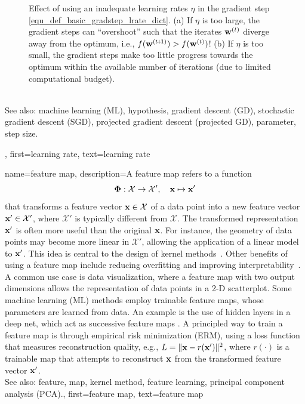 {{{\begin{figure}[hbtp]
\begin{center}
\begin{minipage}{0.45\columnwidth}
			\end{minipage}
		\end{center}
		\caption{Effect of using an inadequate learning rates $\eta$ in the gradient step 
		         \eqref{equ_def_basic_gradstep_lrate_dict}. (a) If $\eta$ is too large, 
				 the gradient steps can ``overshoot'' such that the iterates ${\bf w}^{(t)}$ 
				 diverge away from the optimum, i.e., $f({\bf w}^{(t\!+\!1)}) > f({\bf w}^{(t)})$! 
		(b) If $\eta$ is too small, the gradient steps make too little progress towards 
		the optimum within the available number of iterations (due to limited computational budget). 
		\label{fig_small_large_lrate_dict}}
		\end{figure}
				\\
		See also: machine learning (ML), hypothesis, gradient descent (GD), stochastic gradient descent (SGD), projected gradient descent (projected GD), parameter, step size.},
	first={learning rate},
	text={learning rate} 
}

{name={feature map}, 
	description={A feature map refers to a function 
		$$
		{\bf \Phi}: \mathcal{X} \rightarrow \mathcal{X}', \quad {\bf x} \mapsto {\bf x}'
		$$
		that transforms a feature vector ${\bf x} \in \mathcal{X}$ of 
 		a data point into a new feature vector ${\bf x}' \in \mathcal{X}'$, 
 		where $\mathcal{X}'$ is typically different from $\mathcal{X}$.
 		The transformed representation ${\bf x}'$ is often more useful than the original 
 		${\bf x}$. For instance, the geometry of data points may become more linear 
 		in $\mathcal{X}'$, allowing the application of a linear model to ${\bf x}'$. 
 		This idea is central to the design of kernel methods~\cite{LearningKernelsBook}.
 		Other benefits of using a feature map include reducing overfitting and 
 		improving interpretability~\cite{Ribeiro2016}. A common use case is data 
 		visualization, where a feature map with two output dimensions allows the representation 
 		of data points in a 2-D scatterplot. Some machine learning (ML) methods employ trainable 
 		feature maps, whose parameters are learned from data. An example is 
 		the use of hidden layers in a deep net, which act as successive feature maps 
 		\cite{MallatUnderstandingDeepLearning}. A principled way to train a feature map 
 		is through empirical risk minimization (ERM), using a loss function that measures reconstruction quality, 
 		e.g., $L = \|{\bf x} - r({\bf x}')\|^2$, where $r(\cdot)$ is a trainable
 		map that attempts to reconstruct ${\bf x}$ from the transformed feature vector ${\bf x}'$.
				\\
		See also: feature, map, kernel method, feature learning, principal component analysis (PCA).},
	first={feature map},
	text={feature map} 
}
	
}
